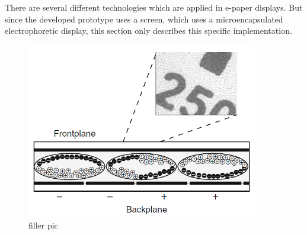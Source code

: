 There are several different technologies which are applied in e-paper displays.
But since the developed prototype uses a screen, which uses a microencapsulated electrophoretic display, this section only describes this specific implementation.


\begin{figure}[h]
	\centering
	\includegraphics[width=0.9\textwidth]{2-theory/e-paper-display/graphics/capsules.png}
	\caption{filler pic\label{theory:capsules}}
\end{figure}



\cite{amundson}